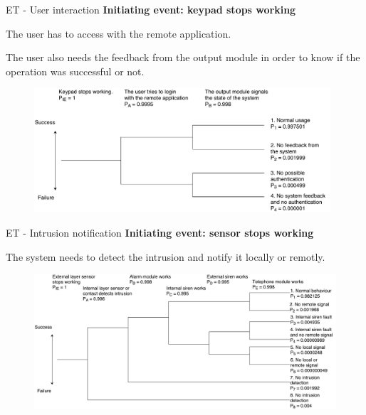 \begin{frame}{ET - User interaction}
  \vskip 0.3cm
    {\textcolor{green!40!black}{\fontsize{13}{15}\textbf{Initiating event: keypad stops working}}}

    The user has to access with the remote application.

    The user also needs the feedback from the
    output module in order to know if the operation was successful or not.
  \vskip 0.4cm
    \begin{figure}[ht!]
      \includegraphics[width=110mm]{images/et_user_interaction.pdf}
      \label{fig:et_user_interaction}
    \end{figure}
\end{frame}

\begin{frame}{ET - Intrusion notification}
  \vskip 0.3cm
    {\textcolor{green!40!black}{\fontsize{13}{15}\textbf{Initiating event: sensor stops working}}}

    The system needs to detect the intrusion and notify it locally or remotly.
    \vskip 0.4cm
    \begin{figure}[ht!]
      \includegraphics[width=120mm]{images/et_alarm_generation.pdf}
      \label{fig:et_alarm_generation}
    \end{figure}
\end{frame}
